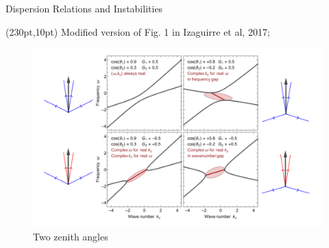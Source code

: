 \begin{frame}{Dispersion Relations and Instabilities}


    \begin{textblock*}{100pt}(230pt,10pt)
         Modified version of Fig. 1 in Izaguirre et al, 2017;
    \end{textblock*}

    \begin{figure}
        \includegraphics[width=\textwidth]{assets/dr/two-zenith-angles-with-configuration}
        \caption*{Two zenith angles}
    \end{figure}


%






\end{frame}

